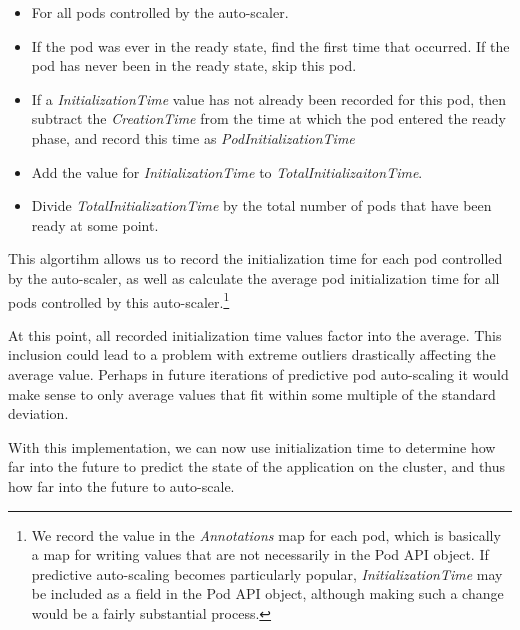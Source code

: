 \begin{itemize}
  \item For all pods controlled by the auto-scaler.
  \item If the pod was ever in the ready state, find the first time that
    occurred. If the pod has never been in the ready state, skip this pod.
  \item If a \textit{InitializationTime} value has not already been recorded for
    this pod, then subtract the \textit{CreationTime} from the time at which the
    pod entered the ready phase, and record this time as
    \textit{PodInitializationTime}
  \item Add the value for \textit{InitializationTime} to
    \textit{TotalInitializaitonTime}.
  \item Divide \textit{TotalInitializationTime} by the total number of pods that
    have been ready at some point.
\end{itemize}

This algortihm allows us to record the initialization time for each pod
controlled by the auto-scaler, as well as calculate the average pod
initialization time for all pods controlled by this auto-scaler.\footnote{We
record the value in the \textit{Annotations} map for each pod,
which is basically a map for writing
values that are not necessarily in the Pod API object. If predictive
auto-scaling becomes particularly popular, \textit{InitializationTime} may be
included as a field in the Pod API object, although making such a change would
be a fairly substantial process.}

At this point, all recorded initialization time values factor into the average.
This inclusion could lead to a problem with extreme outliers drastically
affecting the average value. Perhaps in future iterations of predictive pod
auto-scaling it would make sense to only average values that fit within some
multiple of the standard deviation.

With this implementation, we can now use initialization time to determine how
far into the future to predict the state of the application on the cluster, and
thus how far into the future to auto-scale.
